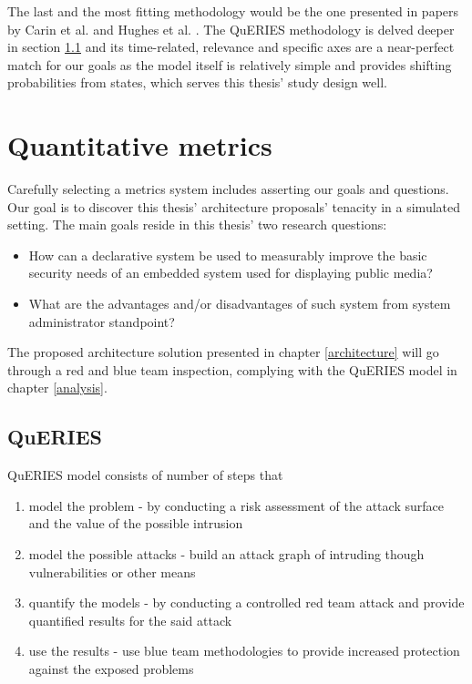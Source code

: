The last and the most fitting methodology would be the one presented
in papers by Carin et al. and Hughes et al.
\cite{carin2008cybersecurity, hughes2013quantitative}. The QuERIES
methodology is delved deeper in section \ref{querieschapter} and its
time-related, relevance and specific axes are a near-perfect match for
our goals as the model itself is relatively simple and provides
shifting probabilities from states, which serves this thesis' study
design well.

\section{Quantitative metrics} \label{quantitativemetrics}

Carefully selecting a metrics system includes asserting our goals and
questions. Our goal is to discover this thesis' architecture proposals'
tenacity in a simulated setting. The main goals reside in this thesis'
two research questions:

\begin{itemize}
\item How can a declarative system be used to measurably improve the basic
  security needs of an embedded system used for displaying public
  media?
\item What are the advantages and/or disadvantages of such system from
  system administrator standpoint?
\end{itemize}

The proposed architecture solution presented in chapter
\ref{architecture} will go through a red and blue team inspection,
complying with the QuERIES model in chapter \ref{analysis}.

\subsection{QuERIES} \label{querieschapter}
QuERIES model consists of number of steps that

\begin{enumerate}
  \item model the problem - by conducting a risk assessment of the
    attack surface and the value of the possible intrusion
  \item model the possible attacks - build an attack graph of
    intruding though vulnerabilities or other means
  \item quantify the models - by conducting a controlled red team
    attack and provide quantified results for the said attack
  \item use the results - use blue team methodologies to provide
    increased protection against the exposed problems
  
\end{enumerate}

